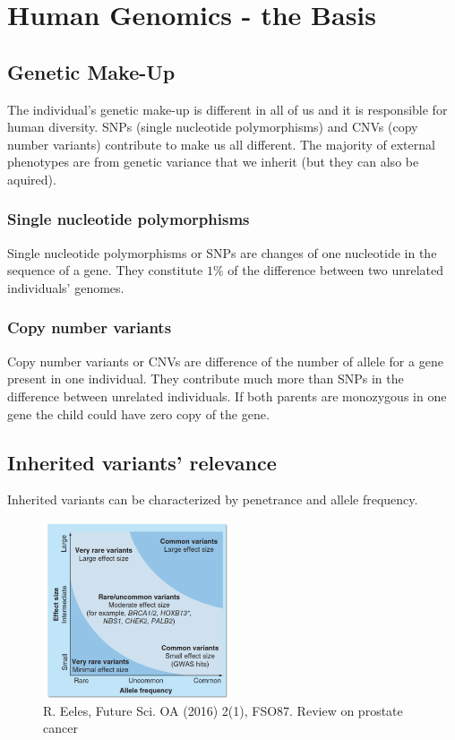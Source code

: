 \section{Human Genomics - the Basis}
\subsection{Genetic Make-Up}
The individual's genetic make-up is different in all of us and it is responsible for human diversity.
SNPs (single nucleotide polymorphisms) and CNVs (copy number variants) contribute to make us all different. 
The majority of external phenotypes are from genetic variance that we inherit (but they can also be aquired). 

		\subsubsection{Single nucleotide polymorphisms}
		Single nucleotide polymorphisms or SNPs are changes of one nucleotide in the sequence of a gene.
		They constitute $1\%$ of the difference between two unrelated individuals' genomes.

		\subsubsection{Copy number variants}
		Copy number variants or CNVs are difference of the number of allele for a gene present in one individual.
		They contribute much more than SNPs in the difference between unrelated individuals.
		If both parents are monozygous in one gene the child could have zero copy of the gene.

\subsection{Inherited variants' relevance}
Inherited variants can be characterized by penetrance and allele frequency.

\begin{figure}[htbp!]
    \centering
    \includegraphics[width=0.5\textwidth]{relevance.png}
    \caption{R. Eeles, Future Sci. OA (2016) 2(1), FSO87. Review on prostate cancer}
    \label{fig:relevance}
\end{figure}

